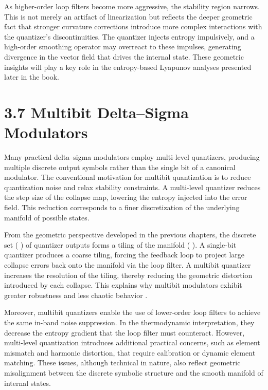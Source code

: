 As higher-order loop filters become more aggressive, the stability region narrows. This is not merely an artifact of linearization but reflects the deeper geometric fact that stronger curvature corrections introduce more complex interactions with the quantizer's discontinuities. The quantizer injects entropy impulsively, and a high-order smoothing operator may overreact to these impulses, generating divergence in the vector field that drives the internal state. These geometric insights will play a key role in the entropy-based Lyapunov analyses presented later in the book.

\section*{3.7 Multibit Delta--Sigma Modulators}

Many practical delta--sigma modulators employ multi-level quantizers, producing multiple discrete output symbols rather than the single bit of a canonical modulator. The conventional motivation for multibit quantization is to reduce quantization noise and relax stability constraints. A multi-level quantizer reduces the step size of the collapse map, lowering the entropy injected into the error field. This reduction corresponds to a finer discretization of the underlying manifold of possible states.

From the geometric perspective developed in the previous chapters, the discrete set ( \Lambda ) of quantizer outputs forms a tiling of the manifold (  ). A single-bit quantizer produces a coarse tiling, forcing the feedback loop to project large collapse errors back onto the manifold via the loop filter. A multibit quantizer increases the resolution of the tiling, thereby reducing the geometric distortion introduced by each collapse. This explains why multibit modulators exhibit greater robustness and less chaotic behavior \citep{candy1992oversampling}.

Moreover, multibit quantizers enable the use of lower-order loop filters to achieve the same in-band noise suppression. In the thermodynamic interpretation, they decrease the entropy gradient that the loop filter must counteract. However, multi-level quantization introduces additional practical concerns, such as element mismatch and harmonic distortion, that require calibration or dynamic element matching. These issues, although technical in nature, also reflect geometric misalignment between the discrete symbolic structure and the smooth manifold of internal states.


